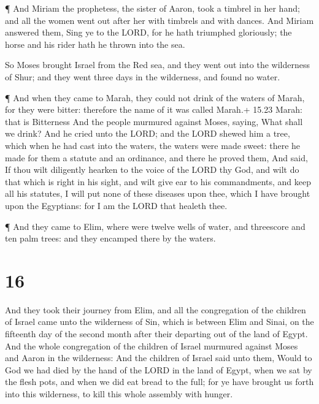  ¶ And Miriam the prophetess, the sister of Aaron, took a
timbrel in her hand; and all the women went out after her with timbrels
and with dances.  And Miriam answered them, Sing ye to the
LORD, for he hath triumphed gloriously; the horse and his rider hath he
thrown into the sea.

 So Moses brought Israel from the Red sea, and they went
out into the wilderness of Shur; and they went three days in the
wilderness, and found no water.

 ¶ And when they came to Marah, they could not drink of the
waters of Marah, for they were bitter: therefore the name of it was
called Marah.+ 15.23 Marah: that is Bitterness  And the
people murmured against Moses, saying, What shall we drink?
 And he cried unto the LORD; and the LORD shewed him a
tree, which when he had cast into the waters, the waters were made
sweet: there he made for them a statute and an ordinance, and there he
proved them,  And said, If thou wilt diligently hearken to
the voice of the LORD thy God, and wilt do that which is right in his
sight, and wilt give ear to his commandments, and keep all his statutes,
I will put none of these diseases upon thee, which I have brought upon
the Egyptians: for I am the LORD that healeth thee.

 ¶ And they came to Elim, where were twelve wells of water,
and threescore and ten palm trees: and they encamped there by the
waters.

\hypertarget{section-15}{%
\section{16}\label{section-15}}

 And they took their journey from Elim, and all the
congregation of the children of Israel came unto the wilderness of Sin,
which is between Elim and Sinai, on the fifteenth day of the second
month after their departing out of the land of Egypt.  And
the whole congregation of the children of Israel murmured against Moses
and Aaron in the wilderness:  And the children of Israel
said unto them, Would to God we had died by the hand of the LORD in the
land of Egypt, when we sat by the flesh pots, and when we did eat bread
to the full; for ye have brought us forth into this wilderness, to kill
this whole assembly with hunger.

